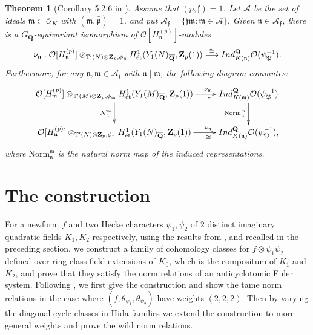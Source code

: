 \documentclass[10pt,letterpaper]{amsart}
\theoremstyle{plain}
\newtheorem{thm}{Theorem}[subsection] %
\theoremstyle{definition}
\theoremstyle{definition}
\theoremstyle{plain}
\theoremstyle{plain}
\theoremstyle{plain}
\theoremstyle{remark}
\numberwithin{equation}{section}
\newcommand{\ppbar}{\bar{\mathfrak{p}}}
\newcommand{\fkm}{\mathfrak{m}}
\newcommand{\fkf}{\mathfrak{f}}
\newcommand{\fkn}{\mathfrak{n}}
\DeclareMathOperator{\et}{\acute{e}t}
\def\cO{\mathcal O}
\newcommand{\Q}{\mathbf{Q}}
\newcommand{\Z}{\mathbf{Z}}
\begin{document}
\begin{thm}[Corollary 5.2.6 in \cite{LLZ-K}]\label{norm1}
Assume that $(p,\fkf)=1$. Let $\mathcal{A}$ be the set of ideals $\fkm\subset\cO_K$  with $(\fkm,\ppbar)=1$, and put $\mathcal{A}_{\fkf}=\{\fkf\fkm\colon\fkm\in\mathcal{A}\}$. Given  $\fkn\in \mathcal{A}_{\mathfrak{f}}$, there is a $G_{\Q}$-equivariant isomorphism of $\mathcal{O}[H_{\fkn}^{(p)}]$-modules 
\begin{equation*}
    \nu_{\fkn}:\mathcal{O}[H_{\fkn}^{(p)}]\otimes_{\mathbb{T}'(N)\otimes\Z_p,\phi_{\fkn}}H^1_{\et}(Y_1(N)_{\overline{\Q}},\Z_p(1))\overset{\cong}{\longrightarrow}{\rm Ind}^{\Q}_{K(\fkn)}\mathcal{O}(\psi_{\mathfrak{P}}^{-1}).
\end{equation*}
 Furthermore, for any $\fkn,\fkm\in \mathcal{A}_\mathfrak{f}$ with $\fkn\mid\fkm$, the following diagram commutes:
\begin{equation*}
    \xymatrix{
\mathcal{O}[H_{\fkm}^{(p)}]\otimes_{\mathbb{T}'(M)\otimes\Z_p,\phi_{\fkm}}H^1_{\et}(Y_1(M)_{\overline{\Q}},\Z_p(1)) \ar[d]_{\mathcal{N}_{\fkn}^{\fkm}} \ar[r]^(.7){\nu_{\fkm}}_(.7){\cong} & {\rm Ind}^{\Q}_{K(\fkm)}\mathcal{O}(\psi_{\mathfrak{P}}^{-1}) \ar[d]_{\mathrm{Norm}_{\fkn}^{\fkm}} \\
\mathcal{O}[H_{\fkn}^{(p)}]\otimes_{\mathbb{T}'(N)\otimes\Z_p,\phi_{\fkn}}H^1_{\et}(Y_1(N)_{\overline{\Q}},\Z_p(1)) \ar[r]^(.7){ \nu_{\fkn}}_(.7){\cong} & {\rm Ind}^{\Q}_{K(\fkn)}\mathcal{O}(\psi_{\mathfrak{P}}^{-1}), }
\end{equation*}
where $\mathrm{Norm}_{\fkn}^{\fkm}$ is the natural norm map of the induced representations.
\end{thm}




\section{The construction}\label{sec:main-thms}



For a newform $f$ and two Hecke characters $\psi_1, \psi_2$ of $2$ distinct imaginary quadratic fields $K_1, K_2$ respectively, using the results from \cite{CD}, \cite{BSV} and \cite{LLZ-K} recalled in the preceding section, we construct a family of cohomology classes for $f\otimes\tilde{\psi}_1\tilde{\psi}_2$ defined over ring class field extensions of $K_0$, which is the compositum of $K_1$ and $K_2$, and prove that they satisfy the norm relations of an anticyclotomic Euler system. Following \cite[Sec.\,2]{CD}, we first give the construction and show the tame norm relations in the case where $(f,\theta_{\psi_1},\theta_{\psi_2})$ have weights $(2,2,2)$. Then by varying the diagonal cycle classes in Hida families we extend the construction to more general weights and prove the wild norm relations.
\end{document}
